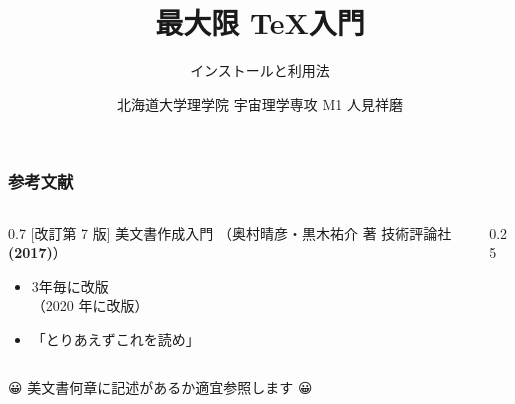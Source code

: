 \documentclass[unicode,12pt,colorlinks,handout]{beamer}
\title{最大限 \TeX 入門}
\subtitle{インストールと利用法}
\author{北海道大学理学院 宇宙理学専攻 M1 人見祥磨}
\date{\warekitoday}
\newcommand{\nishikifont}{\nishikifonta\nishikifontj}
\begin{document}
\rubyusejghost %

\frame{\maketitle}

\begin{frame}
	\frametitle{参考文献}
	\begin{columns}[c]
		\begin{column}{0.7\textwidth}
			[改訂第 7 版] \LaTeXe 美文書作成入門
			{\small （奥村晴彦・黒木祐介 著 技術評論社\textbf{(2017)}）}
			
			\begin{itemize}
				\item 3年毎に改版\\（2020 年に改版）
				\item 「とりあえずこれを読め」
			\end{itemize}
		\end{column}
		\begin{column}{0.25\textwidth}
		\end{column}
	\end{columns}
	{\nishikifont 😀 美文書何章に記述があるか適宜参照します 😀}
\end{frame}
\end{document}
